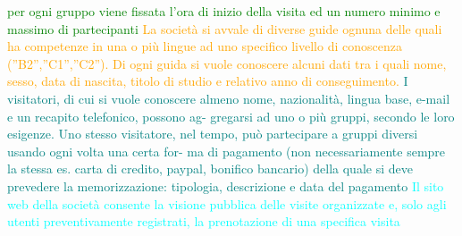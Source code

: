 \documentclass[a4paper,12pt]{report}
\begin{document}
\textcolor{green}{per ogni gruppo viene fissata l’ora di inizio della
visita ed un numero minimo e massimo di partecipanti} 
\textcolor{orange}{La società si avvale
di diverse guide ognuna delle quali ha competenze in una o più 
lingue ad
uno specifico livello di conoscenza (”B2”,”C1”,”C2”). Di ogni guida si vuole
conoscere alcuni dati tra i quali nome, sesso, data di nascita, titolo di studio
e relativo anno di conseguimento.} 
\textcolor{teal}{ I visitatori, di cui si vuole conoscere almeno
nome, nazionalità, lingua base, e-mail e un recapito telefonico, possono ag-
gregarsi ad uno o più gruppi, secondo le loro esigenze. Uno stesso visitatore,
nel tempo, può partecipare a gruppi diversi usando ogni volta una certa for-
ma di pagamento (non necessariamente sempre la stessa es. carta di credito,
paypal, bonifico bancario) della quale si deve prevedere la memorizzazione:
tipologia, descrizione e data del pagamento} 
\textcolor{cyan}{ Il sito web della società consente
la visione pubblica delle visite organizzate e, solo agli utenti preventivamente
registrati, la prenotazione di una specifica visita} 
\end{document}
